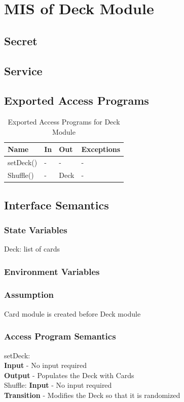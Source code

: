 \documentclass[11pt]{article}
\begin{document}
 	\section{MIS of Deck Module}
     \subsection{Secret}
    \subsection{Service}
    \subsection{Exported Access Programs}
    \begin{table}[h]
    \caption{Exported Access Programs for Deck Module}
    \begin{tabular}{p{4cm}p{2cm}p{2cm}p{4cm}}
    Name & In & Out & Exceptions\\
    \hline
    setDeck() & - & - & - \\
    \hline
    Shuffle() & - & Deck & -\\
    \hline
    \end{tabular}
    \end{table}
    \subsection{Interface Semantics}
    \subsubsection{State Variables}
	Deck: list of cards    
    \subsubsection{Environment Variables}
    \subsubsection{Assumption}
    Card module is created before Deck module
    \subsubsection{Access Program Semantics}
    setDeck:\\
    \textbf{Input} - No input required\\
    \textbf{Output} - Populates the Deck with Cards\\  
    Shuffle:
    \textbf{Input} - No input required\\
    \textbf{Transition} - Modifies the Deck so that it is randomized\\
 	\newline
\end{document}
